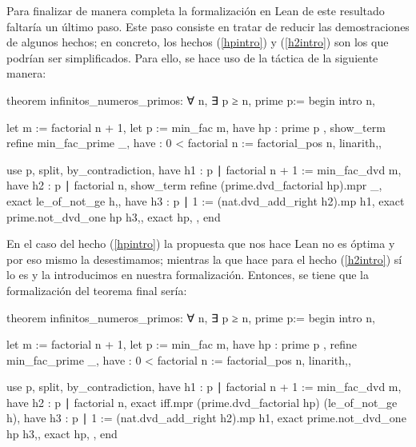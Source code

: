 Para finalizar de manera completa la formalización en Lean de este resultado
faltaría un último paso. Este paso consiste en tratar de reducir las
demostraciones de algunos hechos; en concreto, los hechos (\ref{hpintro}) y
(\ref{h2intro}) son los que podrían ser simplificados. Para ello, se hace
uso de la táctica  de la siguiente manera:
\begin{leancode}
theorem infinitos_numeros_primos:
  ∀ n, ∃ p ≥ n, prime p:=
begin
  intro n,

  let m := factorial n + 1,
  let p := min_fac m,
  have hp : prime p ,
  show_term{ refine min_fac_prime _,
    have : 0 < factorial n := factorial_pos n,
    linarith,},

  use p,
  split,
  { by_contradiction,
    have h1 : p ∣ factorial n + 1 := min_fac_dvd m,
    have h2 : p ∣ factorial n,
    show_term{ refine (prime.dvd_factorial hp).mpr _,
      exact le_of_not_ge h,},
    have h3 : p ∣ 1 := (nat.dvd_add_right h2).mp h1,
    exact prime.not_dvd_one hp h3,},
  { exact hp, },
end
\end{leancode}

En el caso del hecho (\ref{hpintro}) la propuesta que nos hace Lean no es óptima
y por eso mismo la desestimamos; mientras la que hace para el hecho
(\ref{h2intro}) sí lo es y la introducimos en nuestra formalización. Entonces,
se tiene que la formalización del teorema final sería:
\begin{leancode}
theorem infinitos_numeros_primos:
  ∀ n, ∃ p ≥ n, prime p:=
begin
  intro n,

  let m := factorial n + 1,
  let p := min_fac m,
  have hp : prime p ,
  { refine min_fac_prime _,
    have : 0 < factorial n := factorial_pos n,
    linarith,},

  use p,
  split,
  { by_contradiction,
    have h1 : p ∣ factorial n + 1 := min_fac_dvd m,
    have h2 : p ∣ factorial n,
    exact iff.mpr (prime.dvd_factorial hp) (le_of_not_ge h),
    have h3 : p ∣ 1 := (nat.dvd_add_right h2).mp h1,
    exact prime.not_dvd_one hp h3,},
  { exact hp, },
end
\end{leancode}
